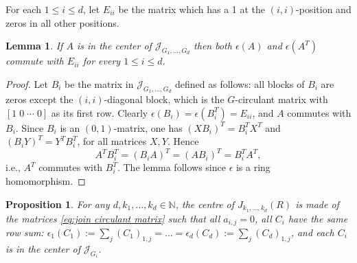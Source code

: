 \documentclass[12pt, a4paper]{amsart}
\numberwithin{equation}{section} %
\theoremstyle{plain}
\theoremstyle{definition}
\theoremstyle{plain}
\newtheorem{prop}[thm]{Proposition}
\newtheorem{lem}[thm]{Lemma}
\theoremstyle{remark}
\newcommand{\N}{\mathbb{N}}
\newcommand{\sJ}{\mathcal{J}}
\begin{document}
For each $1\leq i\leq d$, let $E_{ii}$ be the matrix which has a 1 at the $(i,i)$-position and zeros in all other positions.

\begin{lem}
  If $A$ is in the center of $\sJ_{G_1,\ldots,G_d}$ then both $\epsilon(A)$ and $\epsilon(A^T)$ commute with $E_{ii}$ for every $1\leq i\leq d$.
\end{lem}
\begin{proof} Let $B_i$ be the matrix in $\sJ_{G_1,\ldots,G_d}$  defined as follows: all blocks  of $B_i$ are zeros except the $(i,i)$-diagonal block, which is the $G$-circulant matrix with $[1\; 0 \; \cdots \; 0]$ as its first row. Clearly $\epsilon(B_i)=\epsilon(B_i^T)=E_{ii}$, and $A$ commutes with $B_i$. Since $B_i$ is an $(0,1)$-matrix, one has $(XB_i)^T=B_i^TX^T$ and $(B_iY)^T=Y^TB_i^T$, for all matrices $X,Y$. Hence 
\[
A^T B_i^T=(B_iA)^T=(AB_i)^T=B_i^TA^T,
\] 
i.e., $A^T$ commutes with $B_i^T$. The lemma follows since $\epsilon$ is a ring homomorphism.

\end{proof}

\begin{prop} \label{prop:center}
For any $d,k_1,\dots,k_d\in\N$, the centre of $J_{k_1,\dots,k_d}(R)$ is made of the matrices \eqref{eq:join circulant matrix} such that all $a_{i,j}=0$, all $C_i$ have the same row sum: $\epsilon_1(C_{1}):=\sum_j(C_1)_{1,j}=\dots=\epsilon_d(C_{d}):=\sum_j(C_d)_{1,j}$, and each $C_i$ is in the center of $\sJ_{G_i}$. 
\end{prop}
\end{document}

